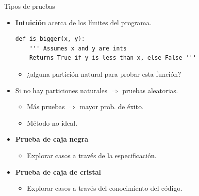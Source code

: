 \documentclass[mathserif]{beamer}
\begin{document}
\begin{frame}[fragile]{Tipos de pruebas}
    \begin{itemize}
        \item {\blue\bfseries Intuición} acerca de los límites del programa.
\begin{lstlisting}
def is_bigger(x, y):
    ''' Assumes x and y are ints
    Returns True if y is less than x, else False '''
\end{lstlisting}
        \begin{itemize}
            \item ¿alguna partición natural para probar esta función?
        \end{itemize}
        
        \item Si no hay particiones naturales $\Rightarrow$ {\blue pruebas aleatorias}.
        \begin{itemize}
            \item Más pruebas $\Rightarrow$ mayor prob. de éxito. 
            \item Método no ideal.
        \end{itemize}
        
        \item {\orange\bfseries Prueba de caja negra}
        \begin{itemize}
            \item Explorar casos a través de la especificación.
        \end{itemize}
        
        \item {\orange\bfseries Prueba de caja de cristal}
        \begin{itemize}
            \item Explorar casos a través del conocimiento del código.
        \end{itemize}
    \end{itemize}
\end{frame}
\end{document}
